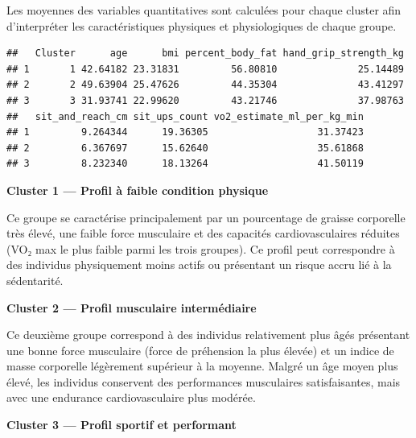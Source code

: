 \documentclass[
]{article}
\newenvironment{Shaded}{\begin{snugshade}}{\end{snugshade}}
\newcommand{\AttributeTok}[1]{\textcolor[rgb]{0.13,0.29,0.53}{#1}}
\newcommand{\FunctionTok}[1]{\textcolor[rgb]{0.13,0.29,0.53}{\textbf{#1}}}
\newcommand{\NormalTok}[1]{#1}
\newcommand{\OtherTok}[1]{\textcolor[rgb]{0.56,0.35,0.01}{#1}}
\newcommand{\SpecialCharTok}[1]{\textcolor[rgb]{0.81,0.36,0.00}{\textbf{#1}}}
\begin{document}
Les moyennes des variables quantitatives sont calculées pour chaque
cluster afin d'interpréter les caractéristiques physiques et
physiologiques de chaque groupe.

\begin{Shaded}
\end{Shaded}

\begin{verbatim}
##   Cluster      age      bmi percent_body_fat hand_grip_strength_kg
## 1       1 42.64182 23.31831         56.80810              25.14489
## 2       2 49.63904 25.47626         44.35304              43.41297
## 3       3 31.93741 22.99620         43.21746              37.98763
##   sit_and_reach_cm sit_ups_count vo2_estimate_ml_per_kg_min
## 1         9.264344      19.36305                   31.37423
## 2         6.367697      15.62640                   35.61868
## 3         8.232340      18.13264                   41.50119
\end{verbatim}

\textbf{Cluster 1 --- Profil à faible condition physique}

Ce groupe se caractérise principalement par un pourcentage de graisse
corporelle très élevé, une faible force musculaire et des capacités
cardiovasculaires réduites (VO₂ max le plus faible parmi les trois
groupes). Ce profil peut correspondre à des individus physiquement moins
actifs ou présentant un risque accru lié à la sédentarité.

\textbf{Cluster 2 --- Profil musculaire intermédiaire}

Ce deuxième groupe correspond à des individus relativement plus âgés
présentant une bonne force musculaire (force de préhension la plus
élevée) et un indice de masse corporelle légèrement supérieur à la
moyenne. Malgré un âge moyen plus élevé, les individus conservent des
performances musculaires satisfaisantes, mais avec une endurance
cardiovasculaire plus modérée.

\textbf{Cluster 3 --- Profil sportif et performant}
\end{document}
